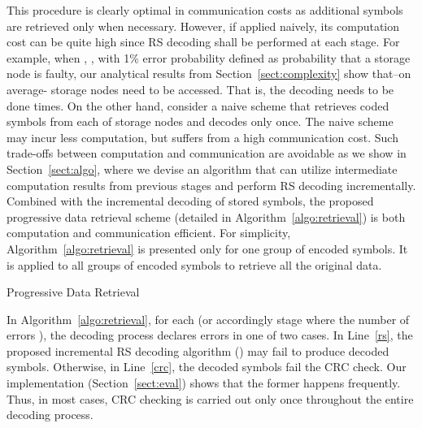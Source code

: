 \documentclass[10pt,journal,letterpaper,compsoc]{IEEEtran}
\newcommand{\0}{{\bf 0}}
\begin{document}
This procedure is clearly optimal in communication costs as additional symbols
are retrieved only when necessary. However, if applied naively, its computation
cost can be quite high since RS decoding shall be performed at each stage.  For
example, when , , with 1\% error probability defined as
probability that a storage node is faulty, our analytical results
from Section~\ref{sect:complexity} show that--on average- storage nodes need
to be accessed.  That is, the decoding needs to be done  times.
On the other hand, consider a naive scheme that
retrieves coded symbols from each of  storage nodes and decodes only once.
The naive scheme may incur less computation, but suffers from a high
communication cost. Such trade-offs between computation and
communication are avoidable as we show in Section~\ref{sect:algo},
where  we devise an algorithm that
can utilize intermediate computation results from previous stages and perform
RS decoding incrementally. Combined with the incremental decoding of stored
symbols, the proposed progressive data retrieval scheme (detailed in
Algorithm~\ref{algo:retrieval}) is both computation and communication
efficient. For simplicity, Algorithm~\ref{algo:retrieval} is  presented only
for one group of encoded symbols. It is applied to all groups of encoded
symbols to retrieve all the original data.


\begin{algorithm}[h]
\caption{Progressive Data Retrieval}
\label{algo:retrieval}
\end{algorithm}


In Algorithm~\ref{algo:retrieval}, for each  (or accordingly stage  where the number of errors ), the decoding process declares
errors in one of two cases. In Line~\ref{rs}, the proposed incremental RS decoding
algorithm () may fail to produce decoded symbols. Otherwise, in
Line~\ref{crc}, the decoded symbols fail the CRC check. Our implementation
(Section~\ref{sect:eval}) shows that the former happens frequently. Thus, in
most cases, CRC checking is carried out only once throughout the entire
decoding process.
\end{document}
